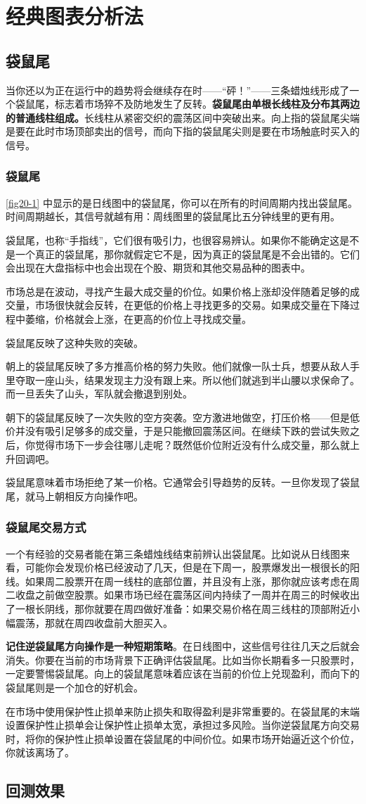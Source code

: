 \chapter{经典图表分析法}
\section{袋鼠尾}
当你还以为正在运行中的趋势将会继续存在时——“砰！”——三条蜡烛线形成了一个袋鼠尾，标志着市场猝不及防地发生了反转。\textbf{袋鼠尾由单根长线柱及分布其两边的普通线柱组成。}长线柱从紧密交织的震荡区间中突破出来。向上指的袋鼠尾尖端是要在此时市场顶部卖出的信号，而向下指的袋鼠尾尖则是要在市场触底时买入的信号。
\subsection*{袋鼠尾}
\autoref{fig20-1} 中显示的是日线图中的袋鼠尾，你可以在所有的时间周期内找出袋鼠尾。时间周期越长，其信号就越有用：周线图里的袋鼠尾比五分钟线里的更有用。

袋鼠尾，也称“手指线”，它们很有吸引力，也很容易辨认。如果你不能确定这是不是一个真正的袋鼠尾，那你就假定它不是，因为真正的袋鼠尾是不会出错的。它们会出现在大盘指标中也会出现在个股、期货和其他交易品种的图表中。

市场总是在波动，寻找产生最大成交量的价位。如果价格上涨却没伴随着足够的成交量，市场很快就会反转，在更低的价格上寻找更多的交易。如果成交量在下降过程中萎缩，价格就会上涨，在更高的价位上寻找成交量。

袋鼠尾反映了这种失败的突破。

朝上的袋鼠尾反映了多方推高价格的努力失败。他们就像一队士兵，想要从敌人手里夺取一座山头，结果发现主力没有跟上来。所以他们就逃到半山腰以求保命了。而一旦丢失了山头，军队就会撤退到别处。

朝下的袋鼠尾反映了一次失败的空方突袭。空方激进地做空，打压价格——但是低价并没有吸引足够多的成交量，于是只能撤回震荡区间。在继续下跌的尝试失败之后，你觉得市场下一步会往哪儿走呢？既然低价位附近没有什么成交量，那么就上升回调吧。

袋鼠尾意味着市场拒绝了某一价格。它通常会引导趋势的反转。一旦你发现了袋鼠尾，就马上朝相反方向操作吧。
\subsection*{袋鼠尾交易方式}
一个有经验的交易者能在第三条蜡烛线结束前辨认出袋鼠尾。比如说从日线图来看，可能你会发现价格已经波动了几天，但是在下周一，股票爆发出一根很长的阳线。如果周二股票开在周一线柱的底部位置，并且没有上涨，那你就应该考虑在周二收盘之前做空股票。如果市场已经在震荡区间内持续了一周并在周三的时候收出了一根长阴线，那你就要在周四做好准备：如果交易价格在周三线柱的顶部附近小幅震荡，那就在周四收盘前大胆买入。

\textbf{记住逆袋鼠尾方向操作是一种短期策略}。在日线图中，这些信号往往几天之后就会消失。你要在当前的市场背景下正确评估袋鼠尾。比如当你长期看多一只股票时，一定要警惕袋鼠尾。向上的袋鼠尾意味着应该在当前的价位上兑现盈利，而向下的袋鼠尾则是一个加仓的好机会。

在市场中使用保护性止损单来防止损失和取得盈利是非常重要的。在袋鼠尾的末端设置保护性止损单会让保护性止损单太宽，承担过多风险。当你逆袋鼠尾方向交易时，将你的保护性止损单设置在袋鼠尾的中间价位。如果市场开始逼近这个价位，你就该离场了。
\section{回测效果}
